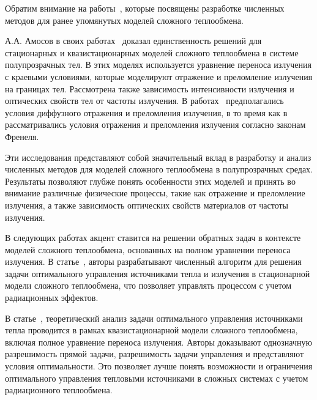     Обратим внимание на работы~\cite{
        asllanaj2004convergence, asllanaj2007transient, banoczi1999fast,
        ghattassi2016galerkin, klein2005transient, kovtanyuk2012},
    которые посвящены разработке численных методов для ранее упомянутых моделей сложного теплообмена.

    А.А. Амосов в своих работах~\cite{
        Amosov2016, Amosov2017, amosov2016unique, amosov2017unique}
    доказал единственность решений для стационарных и квазистационарных
    моделей сложного теплообмена в системе полупрозрачных тел.
    В этих моделях используется уравнение переноса излучения с краевыми условиями,
    которые моделируют отражение и преломление излучения на границах тел.
    Рассмотрена также зависимость интенсивности излучения и оптических свойств
    тел от частоты излучения.
    В работах~\cite{Amosov2016, Amosov2017}
    предполагались условия диффузного отражения и преломления излучения,
    в то время как в~\cite{amosov2016unique, amosov2017unique} рассматривались условия
    отражения и преломления излучения согласно законам Френеля.

    Эти исследования представляют собой значительный вклад в разработку и анализ
    численных методов для моделей сложного теплообмена в полупрозрачных средах.
    Результаты позволяют глубже понять особенности этих моделей и принять во внимание
    различные физические процессы, такие как отражение и преломление излучения,
    а также зависимость оптических свойств материалов от частоты излучения.

    В следующих работах акцент ставится на решении обратных задач в
    контексте моделей сложного теплообмена, основанных на полном уравнении переноса излучения.
    В статье~\cite{end2010optimization}, авторы разрабатывают численный алгоритм для решения
    задачи оптимального управления источниками тепла и излучения в стационарной модели сложного
    теплообмена, что позволяет управлять процессом с учетом радиационных эффектов.

    В статье~\cite{end2011analytical}, теоретический анализ задачи оптимального
    управления источниками тепла проводится в рамках квазистационарной модели сложного теплообмена,
    включая полное уравнение переноса излучения.
    Авторы доказывают однозначную разрешимость прямой задачи,
    разрешимость задачи управления и представляют условия оптимальности.
    Это позволяет лучше понять возможности и ограничения оптимального управления тепловыми
    источниками в сложных системах с учетом радиационного теплообмена.

